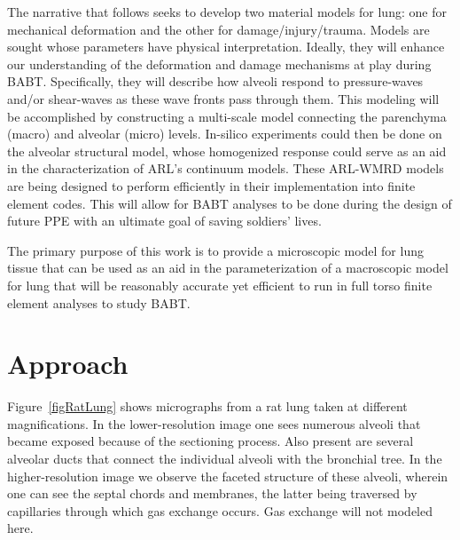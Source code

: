 The narrative that follows seeks to develop two material models for lung: one for mechanical deformation and the other for damage\slash injury\slash trauma.  Models are sought whose parameters have physical interpretation.  Ideally, they will enhance our understanding of the deformation and damage mechanisms at play during BABT.  Specifically, they will describe how alveoli respond to pressure-waves and\slash or shear-waves as these wave fronts pass through them.  This modeling will be accomplished by constructing a multi-scale model connecting the parenchyma (macro) and alveolar (micro) levels.  In-silico experiments could then be done on the alveolar structural model, whose homogenized response could serve as an aid in the characterization of ARL's continuum models.  These ARL-WMRD models are being designed to perform efficiently in their implementation into finite element codes.  This will allow for BABT analyses to be done during the design of future PPE with an ultimate goal of saving soldiers' lives.

The primary purpose of this work is to provide a micro\-scopic model for lung tissue that can be used as an aid in the parameterization of a macro\-scopic model for lung that will be reasonably accurate yet efficient to run in full torso finite element analyses to study BABT.

\section{Approach}

Figure~\ref{figRatLung} shows micrographs from a rat lung taken at different magnifications. In the lower-resolution image one sees numerous alveoli that became exposed because of the sectioning process.  Also present are several alveolar ducts that connect the individual alveoli with the bronchial tree.  In the higher-resolution image we observe the faceted structure of these alveoli, wherein one can see the septal chords and membranes, the latter being traversed by capillaries through which gas exchange occurs.  Gas exchange will not modeled here.


